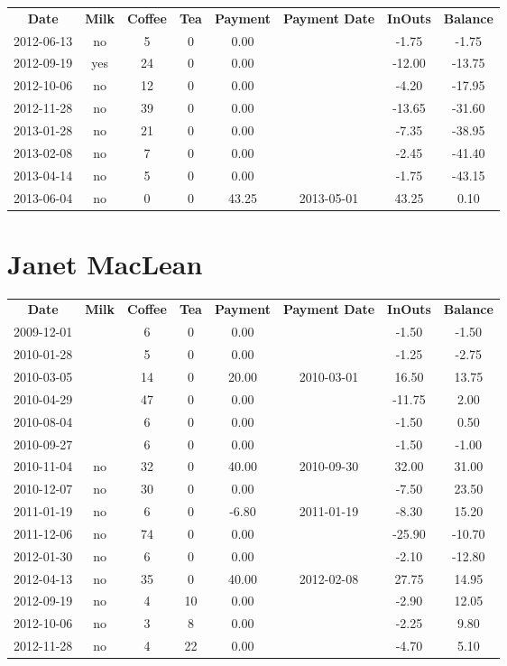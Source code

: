 \begin{center}
\begin{tabular}{cccccccc}
\textbf{Date} & \textbf{Milk} & \textbf{Coffee} & \textbf{Tea} & \textbf{Payment} & \textbf{Payment Date} & \textbf{InOuts} & \textbf{Balance} \\
2012-06-13 & no &  5 & 0 &  0.00 &  &  -1.75 &  -1.75\\ 
2012-09-19 & yes & 24 & 0 &  0.00 &  & -12.00 & -13.75\\ 
2012-10-06 & no & 12 & 0 &  0.00 &  &  -4.20 & -17.95\\ 
2012-11-28 & no & 39 & 0 &  0.00 &  & -13.65 & -31.60\\ 
2013-01-28 & no & 21 & 0 &  0.00 &  &  -7.35 & -38.95\\ 
2013-02-08 & no &  7 & 0 &  0.00 &  &  -2.45 & -41.40\\ 
2013-04-14 & no &  5 & 0 &  0.00 &  &  -1.75 & -43.15\\ 
2013-06-04 & no &  0 & 0 & 43.25 & 2013-05-01 &  43.25 &   0.10
\end{tabular}
\end{center}

\section{Janet MacLean}

\begin{center}
\begin{tabular}{cccccccc}
\textbf{Date} & \textbf{Milk} & \textbf{Coffee} & \textbf{Tea} & \textbf{Payment} & \textbf{Payment Date} & \textbf{InOuts} & \textbf{Balance} \\
2009-12-01 &  &  6 &  0 &  0.00 &  &  -1.50 &  -1.50\\ 
2010-01-28 &  &  5 &  0 &  0.00 &  &  -1.25 &  -2.75\\ 
2010-03-05 &  & 14 &  0 & 20.00 & 2010-03-01 &  16.50 &  13.75\\ 
2010-04-29 &  & 47 &  0 &  0.00 &  & -11.75 &   2.00\\ 
2010-08-04 &  &  6 &  0 &  0.00 &  &  -1.50 &   0.50\\ 
2010-09-27 &  &  6 &  0 &  0.00 &  &  -1.50 &  -1.00\\ 
2010-11-04 & no & 32 &  0 & 40.00 & 2010-09-30 &  32.00 &  31.00\\ 
2010-12-07 & no & 30 &  0 &  0.00 &  &  -7.50 &  23.50\\ 
2011-01-19 & no &  6 &  0 & -6.80 & 2011-01-19 &  -8.30 &  15.20\\ 
2011-12-06 & no & 74 &  0 &  0.00 &  & -25.90 & -10.70\\ 
2012-01-30 & no &  6 &  0 &  0.00 &  &  -2.10 & -12.80\\ 
2012-04-13 & no & 35 &  0 & 40.00 & 2012-02-08 &  27.75 &  14.95\\ 
2012-09-19 & no &  4 & 10 &  0.00 &  &  -2.90 &  12.05\\ 
2012-10-06 & no &  3 &  8 &  0.00 &  &  -2.25 &   9.80\\ 
2012-11-28 & no &  4 & 22 &  0.00 &  &  -4.70 &   5.10
\end{tabular}
\end{center}

